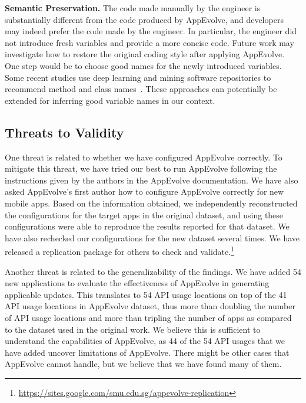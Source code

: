 
\vspace{0.5cm}
\noindent
{\bf Semantic Preservation.}
The code made manually by the engineer is substantially
different from the code produced by AppEvolve, and developers may indeed
prefer the code made by the engineer. In particular, the engineer did not
introduce fresh variables and provide a more concise code.  Future work may investigate how to
restore the original coding style after applying AppEvolve. One step would
be to choose good names for the newly introduced variables. Some recent
studies use deep learning and mining software repositories to recommend
method and class names~\cite{allamanis2015suggesting}. These approaches can
potentially be extended for inferring good variable names in our context.

\subsection{Threats to Validity}

One threat is related to whether we have configured AppEvolve correctly. To
mitigate this threat, we have tried our best to run AppEvolve following the
instructions given by the authors in the AppEvolve documentation. We have
also asked AppEvolve's first author how to configure AppEvolve correctly
for new mobile apps. Based on the information obtained, we independently
reconstructed the configurations for the target apps in the original
dataset, and using these configurations were able to reproduce the results
reported for that dataset.  We have also rechecked our configurations for
the new dataset several times. We have released a replication package for
others to check and
validate.\footnote{\url{https://sites.google.com/smu.edu.sg/appevolve-replication}}

Another threat is related to the generalizability of the findings. We have added 54 new applications to evaluate the effectiveness of
AppEvolve in generating applicable updates. This translates to 54 API usage
locations on top of the 41 API usage locations in AppEvolve dataset, thus
more than doubling the number of API usage locations and more than tripling the number of apps as compared to the dataset used in the original work. We
believe this is sufficient to understand the capabilities of AppEvolve, as
44 of the 54 API usages that we have added uncover limitations of
AppEvolve. There might be other cases that AppEvolve cannot handle, but we
believe that we have found many of them.

